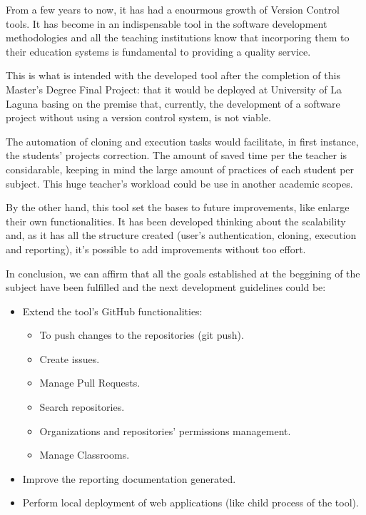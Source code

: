 

From a few years to now, it has had a enourmous growth of Version Control tools. It has become in an indispensable tool in the software development methodologies and all the teaching institutions know that incorporing them to their education systems is fundamental to providing a quality service.
\bigskip

This is what is intended with the developed tool after the completion of this Master's Degree Final Project: that it would be deployed at University of La Laguna basing on the premise that, currently, the development of a software project without using a version control system, is not viable. 
\bigskip

The automation of cloning and execution tasks would facilitate, in first instance, the students' projects correction. The amount of saved time per the teacher is considarable, keeping in mind the large amount of practices of each student per subject. This huge teacher's workload could be use in another academic scopes.
\bigskip

By the other hand, this tool set the bases to future improvements, like enlarge their own functionalities. It has been developed thinking about the scalability and, as it has all the structure created (user's authentication, cloning, execution and reporting), it's possible to add improvements without too effort.
\newpage

In conclusion, we can affirm that all the goals established at the beggining of the subject have been fulfilled and the next development guidelines could be:


\begin{itemize}
	\item Extend the tool's GitHub functionalities:
	\begin{itemize}
		\item To push changes to the repositories (git push).
		\item Create issues.
		\item Manage Pull Requests.
		\item Search repositories.
		\item Organizations and repositories' permissions management.
		\item Manage Classrooms.
	\end{itemize}
	\item Improve the reporting documentation generated.
	\item Perform local deployment of web applications (like child process of the tool).
\end{itemize}

